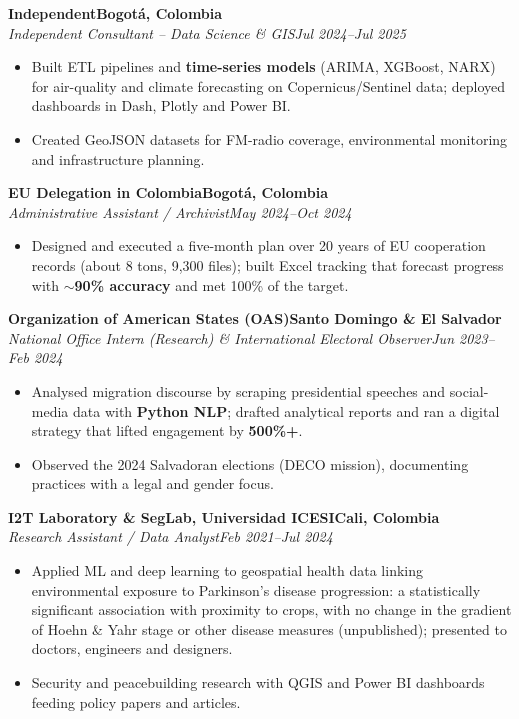 \documentclass[11pt,a4paper]{article}
\newcommand{\cventryhead}[4]{\needspace{4\baselineskip}\textbf{#1}\hfill\textbf{#2}\\\textit{#3}\hfill\textit{#4}\par\vspace{1pt}}
\begin{document}
\cventryhead{Independent}{Bogot\'a, Colombia}{Independent Consultant -- Data Science \& GIS}{Jul 2024--Jul 2025}
\begin{itemize}
\item Built ETL pipelines and \textbf{time-series models} (ARIMA, XGBoost, NARX) for air-quality and climate forecasting on Copernicus/Sentinel data; deployed dashboards in Dash, Plotly and Power BI.
\item Created GeoJSON datasets for FM-radio coverage, environmental monitoring and infrastructure planning.
\end{itemize}

\cventryhead{EU Delegation in Colombia}{Bogot\'a, Colombia}{Administrative Assistant / Archivist}{May 2024--Oct 2024}
\begin{itemize}
\item Designed and executed a five-month plan over 20 years of EU cooperation records (about 8 tons, 9,300 files); built Excel tracking that forecast progress with \textbf{$\sim$90\% accuracy} and met 100\% of the target.
\end{itemize}

\cventryhead{Organization of American States (OAS)}{Santo Domingo \& El Salvador}{National Office Intern (Research) \& International Electoral Observer}{Jun 2023--Feb 2024}
\begin{itemize}
\item Analysed migration discourse by scraping presidential speeches and social-media data with \textbf{Python NLP}; drafted analytical reports and ran a digital strategy that lifted engagement by \textbf{500\%+}.
\item Observed the 2024 Salvadoran elections (DECO mission), documenting practices with a legal and gender focus.
\end{itemize}

\cventryhead{I2T Laboratory \& SegLab, Universidad ICESI}{Cali, Colombia}{Research Assistant / Data Analyst}{Feb 2021--Jul 2024}
\begin{itemize}
\item Applied ML and deep learning to geospatial health data linking environmental exposure to Parkinson's disease progression: a statistically significant association with proximity to crops, with no change in the gradient of Hoehn \& Yahr stage or other disease measures (unpublished); presented to doctors, engineers and designers.
\item Security and peacebuilding research with QGIS and Power BI dashboards feeding policy papers and articles.
\end{itemize}
\end{document}
